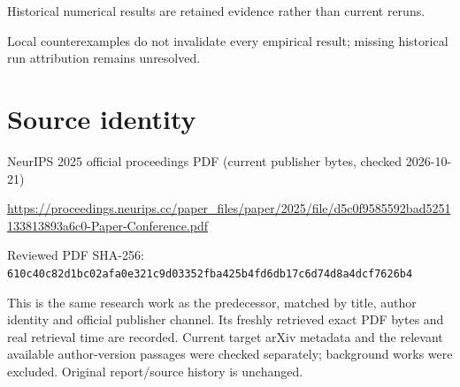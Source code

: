 \documentclass[11pt]{article}
\begin{document}
Historical numerical results are retained evidence rather than current reruns.\par

Local counterexamples do not invalidate every empirical result; missing historical run attribution remains unresolved.\par

\section*{Source identity}

NeurIPS 2025 official proceedings PDF (current publisher bytes, checked 2026-10-21)

\url{https://proceedings.neurips.cc/paper_files/paper/2025/file/d5c0f9585592bad5251133813893a6c0-Paper-Conference.pdf}

Reviewed PDF SHA-256: \nolinkurl{610c40c82d1bc02afa0e321c9d03352fba425b4fd6db17c6d74d8a4dcf7626b4}

This is the same research work as the predecessor, matched by title, author identity and official publisher channel. Its freshly retrieved exact PDF bytes and real retrieval time are recorded. Current target arXiv metadata and the relevant available author-version passages were checked separately; background works were excluded. Original report/source history is unchanged.
\end{document}
